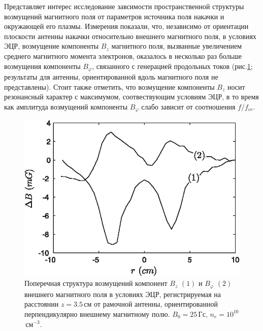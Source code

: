 \documentclass[autoref,10pt]{disser}
\begin{document}
Представляет интерес исследование завсимости пространственной структуры возмущений магнитного поля от параметров источника поля накачки и окружающей его плазмы.
Измерения показали, что, независимо от ориентации плоскости антенны накачки относительно внешнего магнитного поля, в условиях ЭЦР, возмущение компоненты $B_{z}$ магнитного поля, вызванные увеличением среднего магнитного момента электронов,  оказалось в несколько раз больше возмущения компоненты $B_{\varphi}$, связанного с генерацией продольных токов (\mbox{рис.\ref{fig:transverse}}; результаты для антенны, ориентированной вдоль магнитного поля не представлены).  Стоит также отметить, что возмущение компоненты $B_{z}$ носит резонансный характер с максимумом, соотвествующим условиям ЭЦР, в то время как амплитуда возмущений компоненты $B_{\varphi}$ слабо зависит от соотношения $f/f_{ce}$.
\begin{figure}[H]
    \centering
    \includegraphics*[width=0.7\columnwidth]{pics/picSET1+SET2.eps}
    \caption{Поперечная структура возмущений компонент $B_{z}$ $(1)$ и $B_{\varphi}$ $(2)$ внешнего магнитного поля в условиях ЭЦР, регистрируемая на расстоянии $z=3.5$\,см от рамочной антенны, ориентированной перпендикулярно внешнему магнитному полю. $B_{0}=25$\,Гс, $n_{e}=10^{10}$\,см$^{-3}$.}
    \label{fig:transverse}
\end{figure}
\end{document}
